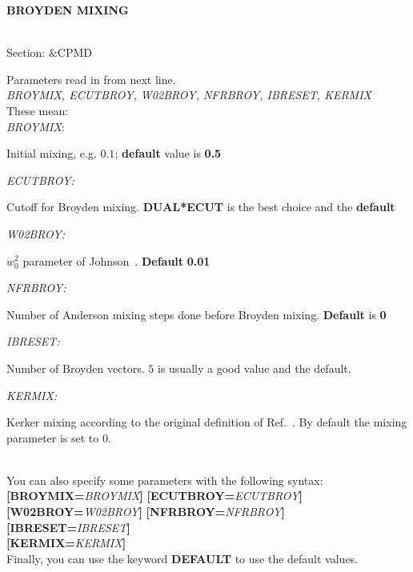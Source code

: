 \documentclass[twoside,10pt,titlepage,a4paper]{article}
\newcommand{\reflabel}[1]{\hypertarget{#1}}
\newcommand{\reflabel}[1]{\label{#1}}
\newcommand{\keyword}[5]{%
\vspace{1.0cm}
\begin{minipage}{15cm}
\reflabel{#1}{\textbf{\large #1}}%
\index{#1}%
\ \textbf{#2}%
\ \textbf{#3}%
\ \textit{#4}%
     \hfill\\\smallskip
     {Section: #5}
     \hfill\\\smallskip\vskip 10pt
\end{minipage}
}%
\newcommand{\desc}[1]{%
   \hspace*{\fill} \parbox{130mm}{\sloppy
                          {#1}%
                             }
     \hfill\\\smallskip
   }%
\newcommand{\desc}[1]{#1\vspace{1ex}}
\newcommand{\defaultvalue}[1]{%
  \textbf{#1}
}
\begin{document}
\keyword{BROYDEN MIXING}{}{}{}{\&CPMD}
  \desc{Parameters read in from next line.\\
    {\sl BROYMIX, ECUTBROY, W02BROY, NFRBROY, IBRESET, KERMIX} \\
    These mean:\\
    \hfill\smallskip
    {\sl BROYMIX}: \hfill\begin{minipage}[t]{10cm}
        Initial mixing, e.g. $0.1$; \textbf{default} value is
        \defaultvalue{0.5}
        \end{minipage}

    {\sl ECUTBROY:} \hfill\begin{minipage}[t]{10cm}
        Cutoff for Broyden mixing. \defaultvalue{DUAL*ECUT} is the best choice
        and the \textbf{default}
        \end{minipage}

    {\sl W02BROY:} \hfill\begin{minipage}[t]{10cm}
        $w_0^2$ parameter of Johnson~\cite{Johnson88}. \textbf{Default}
        \defaultvalue{0.01}
        \end{minipage}

    {\sl NFRBROY:} \hfill\begin{minipage}[t]{10cm}
        Number of Anderson mixing steps done before Broyden mixing.
        \textbf{Default} is \defaultvalue{0}
        \end{minipage}

    {\sl IBRESET:} \hfill\begin{minipage}[t]{10cm}
        Number of Broyden vectors. $5$ is usually a good value and the default.
        \end{minipage}

    {\sl KERMIX:} \hfill\begin{minipage}[t]{10cm}
        Kerker mixing according to the original definition of Ref.~\cite{Kerker}.
        By default the mixing parameter is set to 0.
        \end{minipage}\\

    You can also specify some parameters with the following syntax:\\
        \textbf{[BROYMIX=}\textsl{BROYMIX}\textbf{]}
        \textbf{[ECUTBROY=}\textsl{ECUTBROY}\textbf{]}\\
        \textbf{[W02BROY=}\textsl{W02BROY}\textbf{]}
        \textbf{[NFRBROY=}\textsl{NFRBROY}\textbf{]}\\
        \textbf{[IBRESET=}\textsl{IBRESET}\textbf{]}\\
        \textbf{[KERMIX=}\textsl{KERMIX}\textbf{]}\\
    Finally, you can use the keyword {\bf DEFAULT} to use the default values.}
\end{document}
